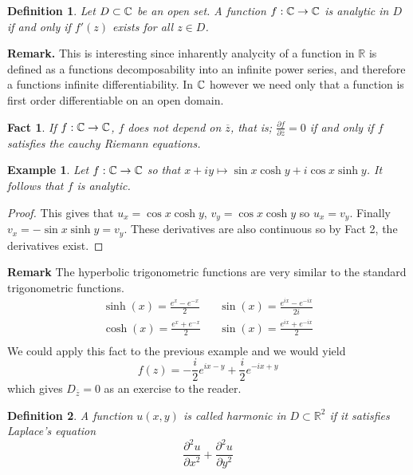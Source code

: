 \documentclass[letter]{article}
\newtheorem{fact}{Fact}
\newtheorem{example}{Example}
\newtheorem{definition}{Definition}
\def\complex{{\mathbb C}\/}
\begin{document}
\begin{definition}
	Let $D \subset \complex$ be an open set. A function $f: \complex \to \complex$ is analytic in $D$ if and only if $f'(z)$ exists for all $z \in D$.
\end{definition}
\noindent \textbf{Remark.} This is interesting since inharently analycity of a function in $\mathbb{R}$ is defined as a functions decomposability into an infinite power series, and therefore a functions infinite differentiability. In $\complex$ however we need only that a function is first order differentiable on an open domain.
\begin{fact}
	If $f: \complex \to \complex$, $f$ does not depend on $\overline{z}$, that is; $\frac{\partial f}{\partial \overline{z}} = 0$ if and only if $f$ satisfies the cauchy Riemann equations. 
\end{fact}
\begin{example}
	Let $f: \complex \to \complex$ so that $x +iy \mapsto \sin x \cosh y + i \cos x \sinh y$. It follows that $f$ is analytic.
\end{example}
\begin{proof}
This gives that $u_x = \cos x \cosh y$, $v_y = \cos x \cosh y$ so $u_x = v_y$. Finally $v_x = -\sin x \sinh y = v_y$. These derivatives are also continuous so by Fact 2, the derivatives exist.
\end{proof}
\noindent \textbf{Remark} The hyperbolic trigonometric functions are very similar to the standard trigonometric functions.
	\begin{equation*}
		\begin{aligned}
			\sinh(x) = \frac{e^x - e^{-x}}{2}& 	&\sin(x) = \frac{e^{ix} - e^{-ix}}{2i}\\
			\cosh(x) = \frac{e^x + e^{-x}}{2}& 	&\sin(x) = \frac{e^{ix} + e^{-ix}}{2}\\
		\end{aligned}
	\end{equation*}
	We could apply this fact to the previous example and we would yield 
	\begin{equation*}
		f(z) = -\frac{i}{2}e^{ix -y} + \frac{i}{2} e^{-ix + y}
	\end{equation*}
	which gives $D_{\overline{z}}  = 0$ as an exercise to the reader.
\begin{definition}
	A function $u(x,y)$ is called harmonic in $D \subset \mathbb{R}^2$ if it satisfies Laplace's equation
	\begin{equation*}
		\frac{\partial^2 u}{\partial x^2} + \frac{\partial^2 u}{\partial y^2}
	\end{equation*}
\end{definition}
\end{document}
